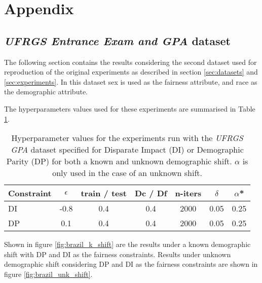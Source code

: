 \section{Appendix} \label{sec:appendix}

\subsection{\textit{UFRGS Entrance Exam and GPA} dataset}\label{sec:appendix1}

The following section contains the results considering the second dataset used for reproduction of the original experiments as described in section \ref{sec:datasets} and \ref{sec:experiments}. In this dataset sex is used as the fairness attribute, and race as the demographic attribute. 

The hyperparameters values used for these experiments are summarised in Table \ref{tab:brazil_hyperparams}.

\begin{table}[ht]
\centering
\footnotesize
    \begin{tabular}{l|c|c|c|c|c|c}
    Constraint & $\epsilon$ & train / test & Dc / Df & n-iters & $\delta$ & $\alpha$* \\\hline 
    DI & -0.8 & 0.4 & 0.4 &  2000 & 0.05 & 0.25\\
    DP & 0.1 & 0.4 & 0.4 & 2000 & 0.05 & 0.25 \\
    \end{tabular}
    \caption{Hyperparameter values for the experiments run with the \textit{UFRGS GPA} dataset specified for Disparate Impact (DI) or Demographic Parity (DP) for both a known and unknown demographic shift. $\alpha$ is only used in the case of an unknown shift.}
    \label{tab:brazil_hyperparams}
\end{table}

Shown in figure \ref{fig:brazil_k_shift} are the results under a known demographic shift with DP and DI as the fairness constraints. Results under unknown demographic shift considering DP and DI as the fairness constraints are shown in figure \ref{fig:brazil_unk_shift}.

